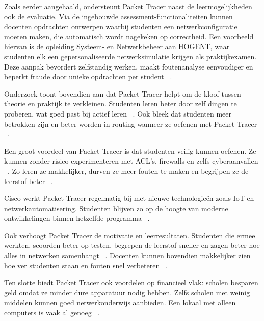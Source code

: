 \vspace{0.3cm}

Zoals eerder aangehaald, ondersteunt Packet Tracer naast de leermogelijkheden ook de evaluatie. Via de ingebouwde assessment-functionaliteiten kunnen docenten opdrachten ontwerpen waarbij studenten een netwerkconfiguratie moeten maken, die automatisch wordt nagekeken op correctheid. Een voorbeeld hiervan is de opleiding Systeem- en Netwerkbeheer aan HOGENT, waar studenten elk een gepersonaliseerde netwerksimulatie krijgen als praktijkexamen. Deze aanpak bevordert zelfstandig werken, maakt foutenanalyse eenvoudiger en beperkt fraude door unieke opdrachten per student ~\autocite{asee_peer_2016}.

\vspace{0.3cm}

Onderzoek toont bovendien aan dat Packet Tracer helpt om de kloof tussen theorie en praktijk te verkleinen. Studenten leren beter door zelf dingen te proberen, wat goed past bij actief leren ~\autocite{Noor2018}. Ook bleek dat studenten meer betrokken zijn en beter worden in routing wanneer ze oefenen met Packet Tracer ~\autocite{Noor2018}.

\vspace{0.3cm}

Een groot voordeel van Packet Tracer is dat studenten veilig kunnen oefenen. Ze kunnen zonder risico experimenteren met ACL’s, firewalls en zelfs cyberaanvallen ~\autocite{Allison2022}. Zo leren ze makkelijker, durven ze meer fouten te maken en begrijpen ze de leerstof beter ~\autocite{Allison2022}.

\vspace{0.3cm}

Cisco werkt Packet Tracer regelmatig bij met nieuwe technologieën zoals IoT en netwerkautomatisering. Studenten blijven zo op de hoogte van moderne ontwikkelingen binnen hetzelfde programma ~\autocite{CiscoPacketTracerFAQ}.

\vspace{0.3cm}

Ook verhoogt Packet Tracer de motivatie en leerresultaten. Studenten die ermee werkten, scoorden beter op testen, begrepen de leerstof sneller en zagen beter hoe alles in netwerken samenhangt ~\autocite{Javid2014}. Docenten kunnen bovendien makkelijker zien hoe ver studenten staan en fouten snel verbeteren ~\autocite{Javid2014}.

\vspace{0.3cm}

Ten slotte biedt Packet Tracer ook voordelen op financieel vlak: scholen besparen geld omdat ze minder dure apparatuur nodig hebben. Zelfs scholen met weinig middelen kunnen goed netwerkonderwijs aanbieden. Een lokaal met alleen computers is vaak al genoeg ~\autocite{Makasiranondh2010}.



